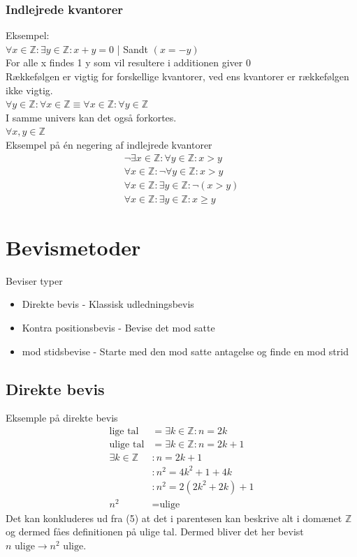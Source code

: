 \documentclass[12pt, a4paper]{article}
\begin{document}
				\subsubsection{Indlejrede kvantorer}
					Eksempel:\\
					$\forall x \in \mathbb{Z} : \exists y \in \mathbb{Z} : x+y=0$ | Sandt $ (x=-y)$\\
					For alle x findes 1 y som vil resultere i additionen giver 0\\
					Rækkefølgen er vigtig for forskellige kvantorer, ved ens kvantorer er rækkefølgen ikke vigtig.\\
					$\forall y \in \mathbb{Z}: \forall x \in \mathbb{Z} \equiv \forall x \in \mathbb{Z}: \forall y \in \mathbb{Z}$\\
					I samme univers kan det også forkortes.\\
					$\forall x,y \in \mathbb{Z}$\\[5mm]
					Eksempel på én negering af indlejrede kvantorer\\
					\begin{align*}
						\neg\exists x \in \mathbb{Z}:\forall y \in \mathbb{Z}:x>y\\
						\forall x \in \mathbb{Z}:\neg\forall y \in \mathbb{Z}: x>y\\
						\forall x \in \mathbb{Z}:\exists y \in \mathbb{Z}: \neg(x>y)\\
						\forall x \in \mathbb{Z}:\exists y \in \mathbb{Z}: x \geq y
					\end{align*}
		\section{Bevismetoder}
			Beviser typer
			\begin{itemize}
				\item Direkte bevis - Klassisk udledningsbevis
				\item Kontra positionsbevis - Bevise det \; mod \;satte
				\item \; mod \;stidsbevise - Starte med den \; mod \;satte antagelse og finde en \; mod \;strid
			\end{itemize}
			\subsection{Direkte bevis}
				Eksemple på direkte bevis
				\begin{align}
					\text{lige tal} &= \exists k\in\mathbb{Z}: n =2k\\
					\text{ulige tal} &= \exists k \in \mathbb{Z}: n=2k+1\\[8mm]
					\exists k \in \mathbb{Z}&: n=2k+1\\
								&: n^2=4k^2+1+4k\\
								&: n^2 = 2(2k^2+2k)+1\\[4mm]
					n^2 &= \text{ulige}
				\end{align}
				Det kan konkluderes ud fra (5) at det i parentesen kan beskrive alt i domænet $\mathbb{Z}$ og dermed fåes definitionen på ulige tal. Dermed bliver det her bevist $n \text{ ulige} \rightarrow n^2 \text{ ulige}$. 
\end{document}
